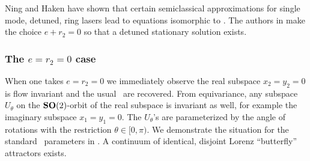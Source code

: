 Ning and Haken have shown that certain semiclassical approximations
for single mode, detuned, ring lasers lead to equations isomorphic to \CLe. %
The authors in 
make the choice $e+r_2=0$ so that a detuned stationary solution exists.

\subsubsection{The $e=r_2=0$ case}

When one takes $e=r_2=0$ we immediately observe the real subspace $x_2=y_2=0$ is flow invariant
and the usual \Le\ are recovered. From equivariance, any subspace $U_\theta$ on the $\mathbf{SO}(2)$-orbit of the real
subspace is invariant as well, for example the imaginary subspace $x_1=y_1=0$. The
$U_\theta$'s are  parameterized by the angle of  rotations with
the restriction $\theta\in[0,\pi)$. We demonstrate the situation for the standard \Le\ parameters
in . A continuum of identical, disjoint Lorenz ``butterfly'' attractors exists.

